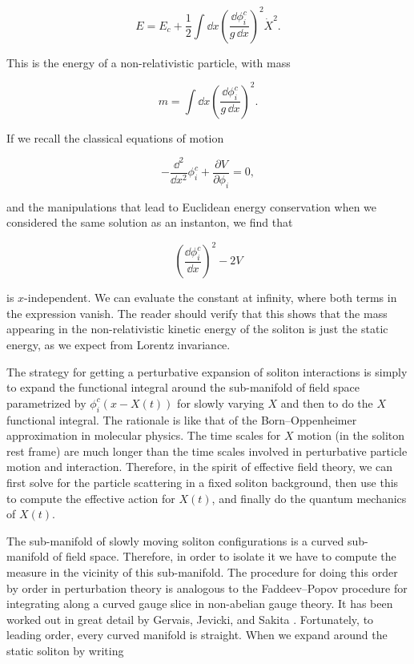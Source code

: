 \[
  E=E_c+\frac12\int\dd x
  \left(\frac{\dd\phi_i^c}{g\,\dd x}\right)^2\dot X^2.
\]

This is the energy of a non-relativistic particle, with mass

\[
  m=\int\dd x\left(\frac{\dd\phi_i^c}{g\,\dd x}\right)^2.
\]

If we recall the classical equations of motion

\[
  -\frac{\dd^2}{\dd x^2}\phi_i^c
  +\frac{\partial V}{\partial\phi_i}=0,
\]

and the manipulations that lead to Euclidean energy conservation when we
considered the same solution as an instanton, we find that

\[
  \left(\frac{\dd\phi_i^c}{\dd x}\right)^2-2V
\]

is $x$-independent. We can evaluate the constant at infinity, where both terms
in the expression vanish. The reader should verify that this shows that the
mass appearing in the non-relativistic kinetic energy of the soliton is just the
static energy, as we expect from Lorentz invariance.

The strategy for getting a perturbative expansion of soliton interactions is
simply to expand the functional integral around the sub-manifold of field space
parametrized by $\phi_i^c(x-X(t))$ for slowly varying $X$ and then to do the $X$
functional integral. The rationale is like that of the Born--Oppenheimer
approximation in molecular physics. The time scales for $X$ motion (in the
soliton rest frame) are much longer than the time scales involved in perturbative
particle motion and interaction. Therefore, in the spirit of effective field
theory, we can first solve for the particle scattering in a fixed soliton
background, then use this to compute the effective action for $X(t)$, and finally
do the quantum mechanics of $X(t)$.

The sub-manifold of slowly moving soliton configurations is a curved
sub-manifold of field space. Therefore, in order to isolate it we have to compute
the measure in the vicinity of this sub-manifold. The procedure for doing this
order by order in perturbation theory is analogous to the Faddeev--Popov
procedure for integrating along a curved gauge slice in non-abelian gauge
theory. It has been worked out in great detail by Gervais, Jevicki, and Sakita
\cite{banks-ref-147}. Fortunately, to leading order, every curved manifold is
straight. When we expand around the static soliton by writing

